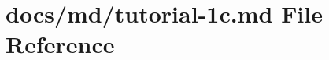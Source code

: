 \hypertarget{tutorial-1c_8md}{}\section{docs/md/tutorial-\/1c.md File Reference}
\label{tutorial-1c_8md}
